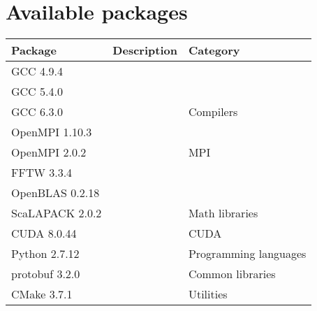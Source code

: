 \newpage
\appendix

\section{Available packages} \label{packages}

\begin{table}[H]
\centering
\label{table:packages}
\begin{tabular}{|l|l|l|}
\hline
\rowcolor[HTML]{FCFF2F} 
\textbf{Package} & \textbf{Description} & \textbf{Category}                \\ \hline
GCC 4.9.4        &                      &                                  \\ \cline{1-2}
GCC 5.4.0        &                      &                                  \\ \cline{1-2}
GCC 6.3.0        &                      & \multirow{-3}{*}{Compilers}      \\ \hline
OpenMPI 1.10.3   &                      &                                  \\ \cline{1-2}
OpenMPI 2.0.2    &                      & \multirow{-2}{*}{MPI}            \\ \hline
FFTW 3.3.4       &                      &                                  \\ \cline{1-2}
OpenBLAS 0.2.18  &                      &                                  \\ \cline{1-2}
ScaLAPACK 2.0.2  &                      & \multirow{-3}{*}{Math libraries} \\ \hline
CUDA 8.0.44      &                      & CUDA                             \\ \hline
Python 2.7.12    &                      & Programming languages            \\ \hline
protobuf 3.2.0   &                      & Common libraries                 \\ \hline
CMake 3.7.1      &                      & Utilities                        \\ \hline
\end{tabular}
\end{table}